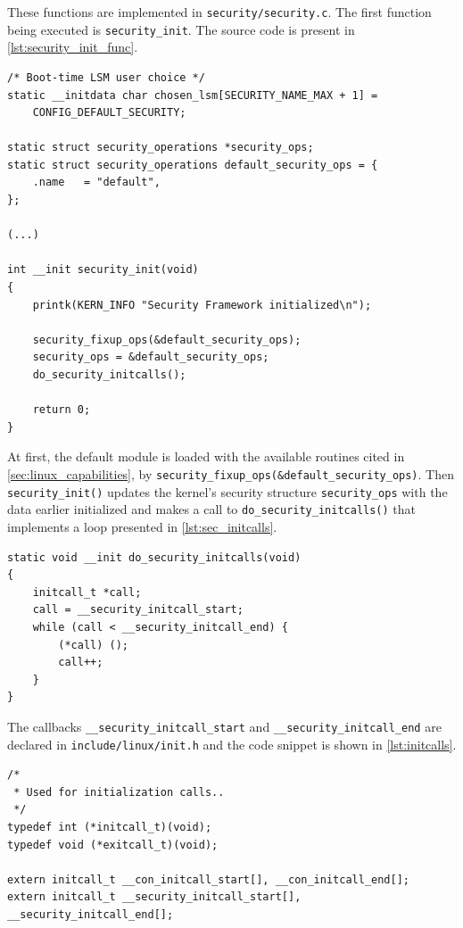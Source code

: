 \noindent
These functions are implemented in \texttt{security/security.c}. The first function being executed is \texttt{security\_init}. The source code is present in \autoref{lst:security_init_func}.

\begin{lstlisting}[frame=none, numbers=none, caption=\texttt{security\_init} function (Linux kernel v3.11), label=lst:security_init_func]
/* Boot-time LSM user choice */
static __initdata char chosen_lsm[SECURITY_NAME_MAX + 1] =
	CONFIG_DEFAULT_SECURITY;

static struct security_operations *security_ops;
static struct security_operations default_security_ops = {
	.name	= "default",
};

(...)

int __init security_init(void)
{
	printk(KERN_INFO "Security Framework initialized\n");

	security_fixup_ops(&default_security_ops);
	security_ops = &default_security_ops;
	do_security_initcalls();

	return 0;
}
\end{lstlisting}

\noindent
At first, the default module is loaded with the available routines cited in \autoref{sec:linux_capabilities}, by \texttt{security\_fixup\_ops(&default\_security\_ops)}. Then \texttt{security\_init()} updates the kernel's security structure \texttt{security\_ops} with the data earlier initialized and makes a call to \texttt{do\_security\_initcalls()} that implements a loop presented in \autoref{lst:sec_initcalls}.

\begin{lstlisting}[frame=none, numbers=none, caption=\texttt{do\_security\_initcalls} function (Linux kernel v3.11), label=lst:sec_initcalls]
static void __init do_security_initcalls(void)
{
	initcall_t *call;
	call = __security_initcall_start;
	while (call < __security_initcall_end) {
		(*call) ();
		call++;
	}
}
\end{lstlisting}

\noindent
The callbacks \texttt{\_\_security\_initcall\_start} and \texttt{\_\_security\_initcall\_end} are declared in \texttt{include/linux/init.h} and the code snippet is shown in \autoref{lst:initcalls}.

\begin{lstlisting}[frame=none, numbers=none, caption=\texttt{init} callbacks (Linux kernel v3.11), label=lst:initcalls]
/*
 * Used for initialization calls..
 */
typedef int (*initcall_t)(void);
typedef void (*exitcall_t)(void);

extern initcall_t __con_initcall_start[], __con_initcall_end[];
extern initcall_t __security_initcall_start[], __security_initcall_end[];
\end{lstlisting}

